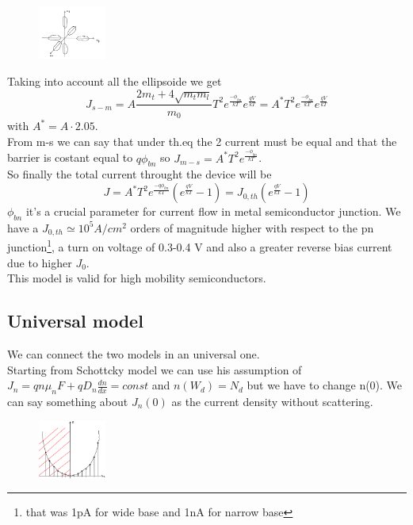 \begin{figure}
\includegraphics[width=0.2\textwidth]{ellips.png}
\end{figure}

Taking into account all the ellipsoide we get
\begin{equation}
J_{s-m}=A \frac{2m_t+4\sqrt{m_tm_l}}{m_0}T^2e^{\frac{-\phi_{bn}}{kT}}e^{\frac{qV}{kT}}=A^*T^2e^{\frac{-\phi_{bn}}{kT}}e^{\frac{qV}{kT}}
\end{equation}
with $A^*=A\cdot2.05$.\\
From m-s we can say that under th.eq the 2 current must be equal and that the barrier is costant equal to $q\phi_{bn}$ so $J_{m-s}=A^*T^2e^{\frac{-\phi_{bn}}{kT}}$.\\
So finally the total current throught the device will be 
\begin{equation}
J=A^*T^2e^{\frac{-q\phi_{bn}}{kT}}(e^{\frac{qV}{kT}}-1)=J_{0,th}(e^{\frac{qV}{kT}}-1)
\end{equation}
$\phi_{bn}$ it's a crucial parameter for current flow in metal semiconductor junction. We have a $J_{0,th}\simeq10^5 A/cm^2$ orders of magnitude higher with respect to the pn junction\footnote{that was 1pA for wide base and 1nA for narrow base}, a turn on voltage of 0.3-0.4 V and also a greater reverse bias current due to higher $J_0$.\\
This model is valid for high mobility semiconductors.\\
\subsection{Universal model}
We can connect the two models in an universal one.\\
Starting from Schottcky model we can use his assumption of $ J_n=qn\mu_nF+qD_n \frac{dn}{dx}=const$ and $n(W_d)=N_d$ but we have to change n(0). We can say something about $J_n(0)$ as the current density without scattering.

\begin{figure}
\includegraphics[width=0.2\textwidth]{generalmsmodel.png}
\end{figure}
 
